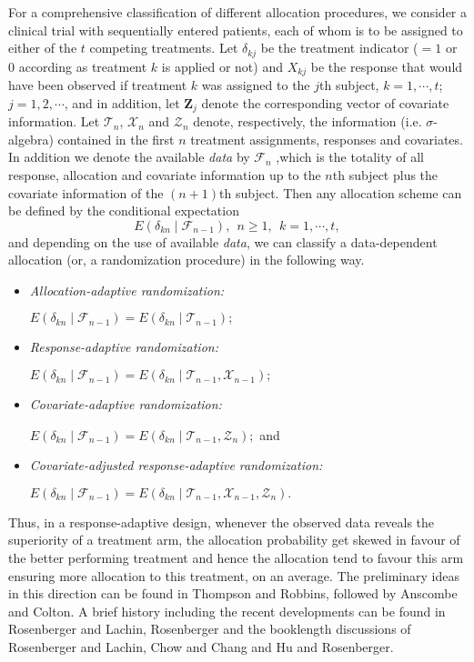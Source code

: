 For a comprehensive classification of different allocation procedures, we consider a clinical trial with sequentially entered patients, each of whom is to be assigned to either of the $t$ competing treatments. Let $\delta_{kj}$ be the treatment indicator ($= 1$ or 0 according as treatment $k$ is applied or not) and $X_{kj}$ be the response that would have been observed
if  treatment $k$ was assigned to the $j$th subject, $k=1,\cdots ,t$; $j=1,2,\cdots$, and  in addition, let  $\textbf{Z}_{j}$ denote the corresponding vector of covariate information. Let $\mathcal{T}_{n}$, $\mathcal{X}_{n}$ and $\mathcal{Z}_{n}$ denote, respectively, the information (i.e. $\sigma$-algebra) contained in the first $n$ treatment assignments, responses and covariates. In addition we denote the available \textit{data} by $\mathcal{F}_{n}$ ,which is the totality of all response, allocation and covariate information up to the $n$th subject plus the covariate information of the $(n+1)$th subject. Then any allocation scheme can be defined by the conditional expectation
$$E(\delta_{kn}\mid \mathcal{F}_{n-1}),~~ n\geq 1, ~~k=1,\cdots ,t,$$
and depending on the use of available \textit{data}, we can classify a data-dependent allocation (or, a randomization procedure) in the following way.

\begin{itemize}
\item {\textit{Allocation-adaptive randomization:}
 \begin{center}
 $E(\delta_{kn}\mid \mathcal{F}_{n-1})=E(\delta_{kn}\mid \mathcal{T}_{n-1});$
\end{center}
}
\item{\textit{Response-adaptive randomization:}
\begin{center}
$E(\delta_{kn}\mid \mathcal{F}_{n-1})=E(\delta_{kn}\mid \mathcal{T}_{n-1},\mathcal{X}_{n-1});$
\end{center}
}
\item{\textit{Covariate-adaptive randomization:}
\begin{center}
 $E(\delta_{kn}\mid \mathcal{F}_{n-1})=E(\delta_{kn}\mid \mathcal{T}_{n-1},\mathcal{Z}_{n});$ and
\end{center}
}
\item{\textit{Covariate-adjusted response-adaptive randomization:}
\begin{center}
$E(\delta_{kn}\mid \mathcal{F}_{n-1})=E(\delta_{kn}\mid \mathcal{T}_{n-1},\mathcal{X}_{n-1},\mathcal{Z}_{n}).$
\end{center}
}
\end{itemize}
\noindent Thus, in a response-adaptive design, whenever the observed data reveals the superiority of a treatment arm, the allocation probability get skewed in favour of the better performing treatment and hence  the allocation tend to favour this arm ensuring more allocation to this treatment\cite{5}, on an average. The preliminary ideas in this direction can be found in Thompson\cite{6} and Robbins\cite{7}, followed by Anscombe\cite{8} and Colton\cite{9}. A brief history including the recent developments can be found in Rosenberger and Lachin\cite{10}, Rosenberger\cite{11} and the booklength discussions  of Rosenberger and Lachin\cite{12}, Chow and Chang\cite{13} and Hu and Rosenberger\cite{14}.

